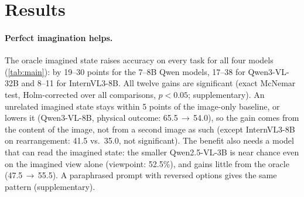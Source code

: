 \section{Results}
\label{sec:results}

\begin{table}[t]
  \centering
  \small
  \setlength{\tabcolsep}{3.2pt}
  \resizebox{\linewidth}{!}{}
  \caption{\textbf{Accuracy (\%) by second input}, 200 questions per task (chance: 50 / 29 / 50). Columns as in \cref{sec:benchmark}; Follows: how often the model gives the answer the misleading state implies. Best per row in bold (excluding Misl.). $^\dagger$Fewer questions (100--200 per task) for Text. --: not run. Physical outcome: an Img.\ score of 50.0 is a constant ``falls over''.}
  \label{tab:main}
\end{table}

\paragraph{Perfect imagination helps.} The oracle imagined state raises accuracy on every task for all four models (\cref{tab:main}): by 19--30 points for the 7--8B Qwen models, 17--38 for Qwen3-VL-32B and 8--11 for InternVL3-8B. All twelve gains are significant (exact McNemar test, Holm-corrected over all comparisons, $p<0.05$; supplementary). An unrelated imagined state stays within 5 points of the image-only baseline, or lowers it (Qwen3-VL-8B, physical outcome: 65.5\,$\rightarrow$\,54.0), so the gain comes from the content of the image, not from a second image as such (except InternVL3-8B on rearrangement: 41.5 vs.\ 35.0, not significant). The benefit also needs a model that can read the imagined state: the smaller Qwen2.5-VL-3B is near chance even on the imagined view alone (viewpoint: 52.5\%), and gains little from the oracle (47.5\,$\rightarrow$\,55.5). A paraphrased prompt with reversed options gives the same pattern (supplementary).

